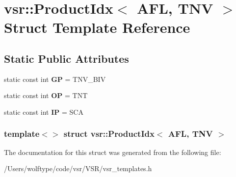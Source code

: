 \hypertarget{structvsr_1_1_product_idx_3_01_a_f_l_00_01_t_n_v_01_4}{\section{vsr\-:\-:Product\-Idx$<$ A\-F\-L, T\-N\-V $>$ Struct Template Reference}
\label{structvsr_1_1_product_idx_3_01_a_f_l_00_01_t_n_v_01_4}
}
\subsection*{Static Public Attributes}
\begin{DoxyCompactItemize}
\item 
\hypertarget{structvsr_1_1_product_idx_3_01_a_f_l_00_01_t_n_v_01_4_ad0a31485da00ee9f039e5d79080eebbc}{static const int {\bfseries G\-P} = T\-N\-V\-\_\-\-B\-I\-V}\label{structvsr_1_1_product_idx_3_01_a_f_l_00_01_t_n_v_01_4_ad0a31485da00ee9f039e5d79080eebbc}

\item 
\hypertarget{structvsr_1_1_product_idx_3_01_a_f_l_00_01_t_n_v_01_4_ae7e4b8c2245c520c97ebfc977d186db3}{static const int {\bfseries O\-P} = T\-N\-T}\label{structvsr_1_1_product_idx_3_01_a_f_l_00_01_t_n_v_01_4_ae7e4b8c2245c520c97ebfc977d186db3}

\item 
\hypertarget{structvsr_1_1_product_idx_3_01_a_f_l_00_01_t_n_v_01_4_a75391bfe49280c1952e4d0fc489b77a6}{static const int {\bfseries I\-P} = S\-C\-A}\label{structvsr_1_1_product_idx_3_01_a_f_l_00_01_t_n_v_01_4_a75391bfe49280c1952e4d0fc489b77a6}

\end{DoxyCompactItemize}
\subsubsection*{template$<$$>$ struct vsr\-::\-Product\-Idx$<$ A\-F\-L, T\-N\-V $>$}



The documentation for this struct was generated from the following file\-:\begin{DoxyCompactItemize}
\item 
/\-Users/wolftype/code/vsr/\-V\-S\-R/vsr\-\_\-templates.\-h\end{DoxyCompactItemize}
